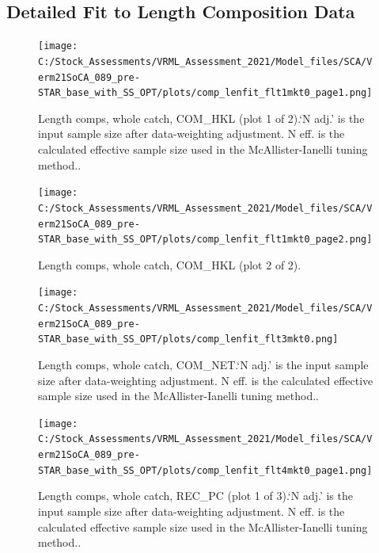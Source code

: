 \documentclass[11pt,
  english,
  a4paper,
]{article}
\begin{document}
\leavevmode\tagmcend\tagstructend


\hypertarget{append-fit}{%
\subsection{Detailed Fit to Length Composition Data}\label{append-fit}}

\leavevmode\tagmcend\tagstructend

\begin{figure}
\centering
\texttt{[image: C:/Stock\_Assessments/VRML\_Assessment\_2021/Model\_files/SCA/Verm21SoCA\_089\_pre-STAR\_base\_with\_SS\_OPT/plots/comp\_lenfit\_flt1mkt0\_page1.png]}
\caption{Length comps, whole catch, COM\_HKL (plot 1 of 2).`N adj.' is the input sample size after data-weighting adjustment. N eff. is the calculated effective sample size used in the McAllister-Ianelli tuning method..\label{fig:comp_lenfit_flt1mkt0_page1}}
\end{figure}

\begin{figure}
\centering
\texttt{[image: C:/Stock\_Assessments/VRML\_Assessment\_2021/Model\_files/SCA/Verm21SoCA\_089\_pre-STAR\_base\_with\_SS\_OPT/plots/comp\_lenfit\_flt1mkt0\_page2.png]}
\caption{Length comps, whole catch, COM\_HKL (plot 2 of 2).\label{fig:comp_lenfit_flt1mkt0_page2}}
\end{figure}

\begin{figure}
\centering
\texttt{[image: C:/Stock\_Assessments/VRML\_Assessment\_2021/Model\_files/SCA/Verm21SoCA\_089\_pre-STAR\_base\_with\_SS\_OPT/plots/comp\_lenfit\_flt3mkt0.png]}
\caption{Length comps, whole catch, COM\_NET.`N adj.' is the input sample size after data-weighting adjustment. N eff. is the calculated effective sample size used in the McAllister-Ianelli tuning method..\label{fig:comp_lenfit_flt3mkt0}}
\end{figure}

\begin{figure}
\centering
\texttt{[image: C:/Stock\_Assessments/VRML\_Assessment\_2021/Model\_files/SCA/Verm21SoCA\_089\_pre-STAR\_base\_with\_SS\_OPT/plots/comp\_lenfit\_flt4mkt0\_page1.png]}
\caption{Length comps, whole catch, REC\_PC (plot 1 of 3).`N adj.' is the input sample size after data-weighting adjustment. N eff. is the calculated effective sample size used in the McAllister-Ianelli tuning method..\label{fig:comp_lenfit_flt4mkt0_page1}}
\end{figure}
\end{document}
